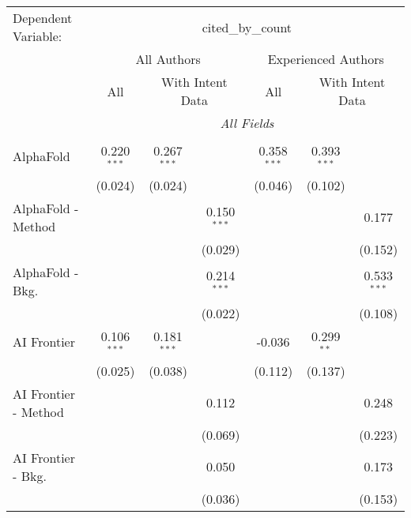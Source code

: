 \begingroup
\centering
\begin{tabular}{lcccccc}
   \tabularnewline \midrule \midrule
   Dependent Variable: & \multicolumn{6}{c}{cited\_by\_count}\\
 & \multicolumn{3}{c}{All Authors} & \multicolumn{3}{c}{Experienced Authors} \\
\cmidrule(lr){2-4} \cmidrule(lr){5-7}
 & \multicolumn{1}{c}{All} & \multicolumn{2}{c}{With Intent Data} & \multicolumn{1}{c}{All} & \multicolumn{2}{c}{With Intent Data} \\
\cmidrule(lr){2-2} \cmidrule(lr){3-4} \cmidrule(lr){5-5} \cmidrule(lr){6-7}
 & \multicolumn{6}{c}{\textit{All Fields}} \\ \\
   AlphaFold            & 0.220$^{***}$ & 0.267$^{***}$ &               & 0.358$^{***}$ & 0.393$^{***}$ &   \\   
                        & (0.024)       & (0.024)       &               & (0.046)       & (0.102)       &   \\   
   AlphaFold - Method   &               &               & 0.150$^{***}$ &               &               & 0.177\\   
                        &               &               & (0.029)       &               &               & (0.152)\\   
   AlphaFold - Bkg.     &               &               & 0.214$^{***}$ &               &               & 0.533$^{***}$\\   
                        &               &               & (0.022)       &               &               & (0.108)\\   
   AI Frontier          & 0.106$^{***}$ & 0.181$^{***}$ &               & -0.036        & 0.299$^{**}$  &   \\   
                        & (0.025)       & (0.038)       &               & (0.112)       & (0.137)       &   \\   
   AI Frontier - Method &               &               & 0.112         &               &               & 0.248\\   
                        &               &               & (0.069)       &               &               & (0.223)\\   
   AI Frontier - Bkg.   &               &               & 0.050         &               &               & 0.173\\   
                        &               &               & (0.036)       &               &               & (0.153)\\   

\end{tabular}
